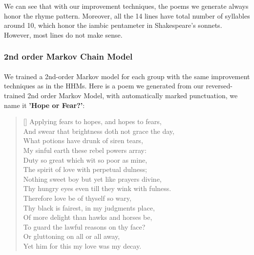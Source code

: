 We can see that with our improvement techniques, the poems we generate always honor the rhyme pattern. Moreover, all the 14 lines have total number of syllables around 10, which honor the iambic pentameter in Shakespeare's sonnets. However, most lines do not make sense.

\subsubsection{2nd order Markov Chain Model}
\paragraph{}
We trained a 2nd-order Markov model for each group with the same improvement techniques as in the HHMs. Here is a poem we generated from our reversed-trained 2nd order Markov Model, with automatically marked punctuation, we name it \textbf{'Hope or Fear?'}:
\renewcommand{\poemtoc}{subsection}
\settowidth{\versewidth}{Thy proud hearts slave and vassal wretch to be?}
\begin{verse}[\versewidth]
Applying fears to hopes, and hopes to fears,\\
And swear that brightness doth not grace the day,\\
What potions have drunk of siren tears,\\
My sinful earth these rebel powers array:\\
\vspace{5pt}
Duty so great which wit so poor as mine,\\
The spirit of love with perpetual dulness;\\
Nothing sweet boy but yet like prayers divine,\\
Thy hungry eyes even till they wink with fulness.\\
\vspace{5pt}
Therefore love be of thyself so wary,\\
Thy black is fairest, in my judgments place,\\
Of more delight than hawks and horses be,\\
To guard the lawful reasons on thy face?\\
\vspace{5pt}
\vin  Or gluttoning on all or all away,\\
\vin  Yet him for this my love was my decay.\\
\end{verse}
